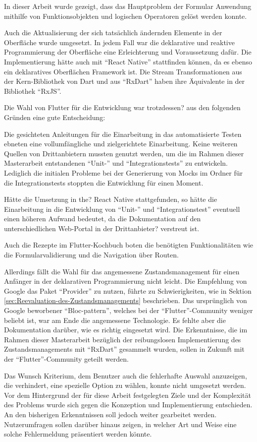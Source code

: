 

In dieser Arbeit wurde gezeigt, dass  das Hauptproblem der Formular Anwendung mithilfe von Funktionsobjekten und logischen Operatoren gelöst werden konnte. 

Auch die  Aktualisierung der sich tatsächlich ändernden Elemente in der Oberfläche wurde umgesetzt.
In jedem Fall war die deklarative und reaktive Programmierung der Oberfläche eine Erleichterung und Voraussetzung dafür.
Die Implementierung hätte auch mit \enquote{React Native} stattfinden können,
da es ebenso ein deklaratives Oberflächen Framework ist.
Die Stream Transformationen aus der Kern-Bibliothek von Dart und aus \enquote{RxDart} haben ihre Äquivalente in der Bibliothek \enquote{RxJS}.

Die Wahl von Flutter für die Entwicklung war trotzdessen? aus den folgenden Gründen eine gute Entscheidung:

Die gesichteten Anleitungen für die Einarbeitung in das automatisierte Testen ebneten eine vollumfängliche und zielgerichtete Einarbeitung.
Keine weiteren Quellen von Drittanbietern mussten genutzt werden,
um die im Rahmen dieser Masterarbeit entstandenen \enquote{Unit-} und \enquote{Integrationstests} zu entwickeln.
Lediglich die initialen Probleme bei der Generierung von Mocks im Ordner für die Integrationstests stoppten die Entwicklung für einen Moment.

Hätte die Umsetzung in the? React Native stattgefunden,
so hätte die Einarbeitung in die Entwicklung von \enquote{Unit-} und \enquote{Integrationstest} eventuell einen höheren Aufwand bedeutet,
da die Dokumentation auf den unterschiedlichen Web-Portal in der Drittanbieter? verstreut ist.

Auch die Rezepte im Flutter-Kochbuch boten die benötigten Funktionalitäten wie die Formularvalidierung und
die Navigation über Routen. 

Allerdings fällt die Wahl für das angemessene Zustandsmanagement für einen Anfänger in der deklarativen Programmierung nicht leicht.
Die Empfehlung von Google das Paket \enquote{Provider} zu nutzen, führte zu Schwierigkeiten,
wie in Sektion \ref{sec:Reevaluation-des-Zustandsmanagements}
beschrieben.
Das ursprünglich von Google beworbener \enquote{Bloc-pattern},
welches bei der \enquote{Flutter}-Community weniger beliebt ist,
war am Ende die angemessene Technologie.
Es fehlte aber die Dokumentation darüber,
wie es richtig eingesetzt wird.
Die Erkenntnisse,
die im Rahmen dieser Masterarbeit bezüglich der reibungslosen Implementierung des Zustandsmanagements mit \enquote{RxDart} gesammelt wurden,
sollen in Zukunft mit der \enquote{Flutter}-Community geteilt werden.

Das Wunsch Kriterium,
dem Benutzer auch die fehlerhafte Auswahl anzuzeigen,
die verhindert,
eine spezielle Option zu wählen,
konnte nicht umgesetzt werden.
Vor dem Hintergrund der für diese Arbeit festgelegten Ziele
und der Komplexität des Problems wurde sich gegen die Konzeption und Implementierung entschieden.
An den bisherigen Erkenntnissen soll jedoch weiter gearbeitet werden.
Nutzerumfragen sollen darüber hinaus zeigen,
in welcher Art und Weise eine solche Fehlermeldung präsentiert werden könnte.

 